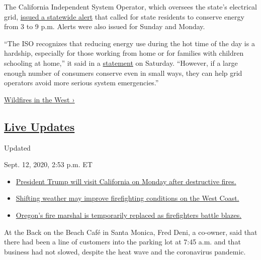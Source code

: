 The California Independent System Operator, which oversees the state's
electrical grid,
\href{https://twitter.com/California_ISO/status/1302261219399577600?s=20}{issued
a statewide alert} that called for state residents to conserve energy
from 3 to 9 p.m. Alerts were also issued for Sunday and Monday.

``The ISO recognizes that reducing energy use during the hot time of the
day is a hardship, especially for those working from home or for
families with children schooling at home,'' it said in a
\href{http://www.caiso.com/Documents/Due-ExtremeHeatForecastsFlexAlertCalledTodayThroughMonday.pdf}{statement}
on Saturday. ``However, if a large enough number of consumers conserve
even in small ways, they can help grid operators avoid more serious
system emergencies.''

\href{https://www.nytimes3xbfgragh.onion/spotlight/california-wildfires}{Wildfires
in the West ›}

\hypertarget{live-updates}{%
\subsection{\texorpdfstring{\href{https://www.nytimes3xbfgragh.onion/2020/09/12/us/wildfires-live-updates.html}{Live
Updates}}{Live Updates}}\label{live-updates}}

Updated~

Sept. 12, 2020, 2:53 p.m. ET

\begin{itemize}
\tightlist
\item
  \href{https://www.nytimes3xbfgragh.onion/2020/09/12/us/wildfires-live-updates.html\#link-f3961ff}{President
  Trump will visit California on Monday after destructive fires.}
\item
  \href{https://www.nytimes3xbfgragh.onion/2020/09/12/us/wildfires-live-updates.html\#link-7e503ae9}{Shifting
  weather may improve firefighting conditions on the West Coast.}
\item
  \href{https://www.nytimes3xbfgragh.onion/2020/09/12/us/wildfires-live-updates.html\#link-5e4c548d}{Oregon's
  fire marshal is temporarily replaced as firefighters battle blazes.}
\end{itemize}

At the Back on the Beach Café in Santa Monica, Fred Deni, a co-owner,
said that there had been a line of customers into the parking lot at
7:45 a.m. and that business had not slowed, despite the heat wave and
the coronavirus pandemic.


